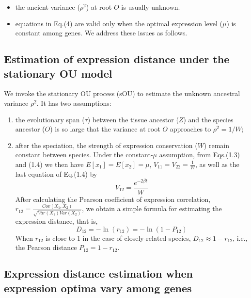 \documentclass[]{book}
\providecommand{\tightlist}{%
  \setlength{\itemsep}{0pt}\setlength{\parskip}{0pt}}
\begin{document}
\begin{itemize}
\tightlist
\item
  the ancient variance (\(\rho^2\)) at root \(O\) is usually unknown.
\item
  equations in Eq.(4) are valid only when the optimal expression level (\(\mu\)) is constant among genes. We address these issues as follows.
\end{itemize}

\hypertarget{estimation-of-expression-distance-under-the-stationary-ou-model}{%
\subsection{Estimation of expression distance under the stationary OU model}\label{estimation-of-expression-distance-under-the-stationary-ou-model}}

We invoke the stationary OU process (sOU) to estimate the unknown ancestral variance \(\rho^2\). It has two assumptions:

\begin{enumerate}
\def\labelenumi{\arabic{enumi}.}
\tightlist
\item
  the evolutionary span (\(\tau\)) between the tissue ancestor (\(Z\)) and the species ancestor (\(O\)) is so large that the variance at root \(O\) approaches to \(\rho^2=1/W\);
\item
  after the speciation, the strength of expression conservation (\(W\)) remain constant between species. Under the constant-\(\mu\) assumption, from Eqs.(1.3) and (1.4) we then have \(E\left[x_1\right]=E\left[x_2\right]=\mu\), \(V_{11}=V_{22}=\frac{1}{W}\), as well as the last equation of Eq.(1.4) by
  \[V_{12}=\frac{e^{-2\beta t}}{W}\tag{1.6}\]
  After calculating the Pearson coefficient of expression correlation, \(r_{12}=\frac{Cov\left(X_1,X_2\right)}{\sqrt{Var\left(X_1\right)Var\left(X_2\right)}}\), we obtain a simple formula for estimating the expression distance, that is,
  \[D_{12}=-\ln\left(r_{12}\right)=-\ln\left(1-P_{12}\right)\tag{1.7}\]
  When \(r_{12}\) is close to 1 in the case of closely-related species, \(D_{12} \approx 1- r_{12}\), i.e., the Pearson distance \(P_{12}=1- r_{12}\).
\end{enumerate}

\hypertarget{expression-distance-estimation-when-expression-optima-vary-among-genes}{%
\subsection{Expression distance estimation when expression optima vary among genes}\label{expression-distance-estimation-when-expression-optima-vary-among-genes}}
\end{document}
